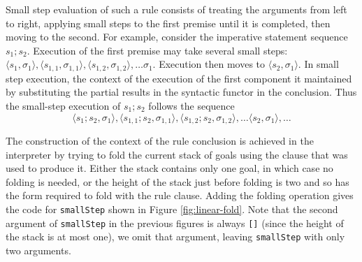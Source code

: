 \documentclass{llncs}
\begin{document}
Small step evaluation of such a rule consists of treating the arguments from left to right, applying small steps to the first premise until it
is completed, then moving to the second. For example, consider the imperative statement sequence $s_1;s_2$. Execution of the
first premise may take several small steps: $\langle s_1, \sigma_1\rangle, \langle s_{1,1}, \sigma_{1,1}\rangle, \langle s_{1,2}, \sigma_{1,2}\rangle, \ldots \sigma_1$.
Execution then moves to $\langle s_2, \sigma_1\rangle$.  
In small step execution, the context of the execution of the first component it
maintained by substituting the partial results in the syntactic functor in the conclusion. Thus the small-step execution of $s_1;s_2$ follows the sequence
$$\langle s_1;s_2, \sigma_1\rangle, \langle s_{1,1};s_2, \sigma_{1,1}\rangle, \langle s_{1,2};s_2, \sigma_{1,2}\rangle, \ldots \langle s_2,\sigma_1\rangle,\ldots$$

The construction of the context of the rule conclusion is achieved in the interpreter by trying to fold the current stack of goals using the 
clause that was used to produce it. Either the stack contains only one goal, in which case no folding is needed, or
the height of the stack just before folding is two and so has the form required to fold with the rule clause.
Adding the folding operation gives the code for \texttt{smallStep} shown in Figure \ref{fig:linear-fold}. 
Note that the second argument of \texttt{smallStep} in the previous figures is always \texttt{[]} (since the height of the stack is at most one), we
omit that argument, leaving \texttt{smallStep} with only two arguments.
\end{document}
